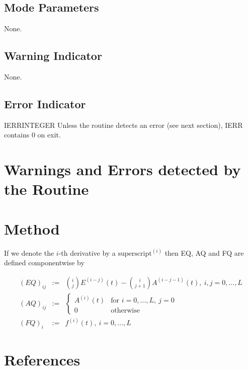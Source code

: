 \subsection{Mode Parameters}
None.

\subsection{Warning Indicator}
None.

\subsection{Error Indicator}

\begin{entry}{IERR}{INTEGER}
  Unless the routine detects an error (see next section), IERR
  contains $0$ on exit.
\end{entry}

\section{Warnings and Errors detected by the Routine}


\section{Method}
If we denote the
$i$-th derivative by a $\mbox{superscript}^{(i)}$ then EQ, AQ and
FQ are defined componentwise by

\begin{eqnarray*}
  (EQ)_{ij} &:=& {i \choose j} E^{(i-j)}(t) -
  {i \choose j+1}A^{(i-j-1)}(t),\ i,j=0,\dots,L \\
  (AQ)_{ij} &:=& \left\{
    \begin{array}{cl}
      A^{(i)}(t) & \mbox{for } i=0,\dots,L,\ j=0 \\
      0          & \mbox{otherwise}
    \end{array}
  \right. \\
  (FQ)_i &:=& f^{(i)}(t),\ i=0,\dots,L
\end{eqnarray*}

\section{References}

